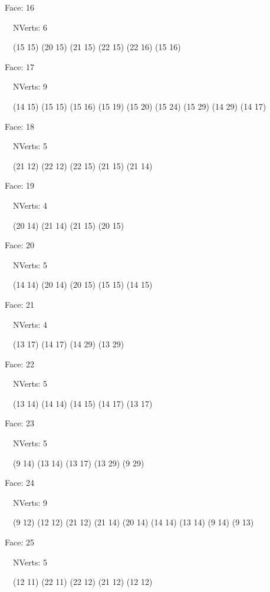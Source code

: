 \documentclass{article}
\begin{document}
{\footnotesize 

Face: 16

\   \    NVerts: 6

 \   \   (15 15) (20 15) (21 15) (22 15) (22 16) (15 16)}

{\footnotesize 

Face: 17

\   \    NVerts: 9

 \   \   (14 15) (15 15) (15 16) (15 19) (15 20) (15 24) (15 29) (14 29) (14 17)}

{\footnotesize 

Face: 18

\   \    NVerts: 5

 \   \   (21 12) (22 12) (22 15) (21 15) (21 14)}

{\footnotesize 

Face: 19

\   \    NVerts: 4

 \   \   (20 14) (21 14) (21 15) (20 15)}

{\footnotesize 

Face: 20

\   \    NVerts: 5

 \   \   (14 14) (20 14) (20 15) (15 15) (14 15)}

{\footnotesize 

Face: 21

\   \    NVerts: 4

 \   \   (13 17) (14 17) (14 29) (13 29)}

{\footnotesize 

Face: 22

\   \    NVerts: 5

 \   \   (13 14) (14 14) (14 15) (14 17) (13 17)}

{\footnotesize 

Face: 23

\   \    NVerts: 5

 \   \   (9 14) (13 14) (13 17) (13 29) (9 29)}

{\footnotesize 

Face: 24

\   \    NVerts: 9

 \   \   (9 12) (12 12) (21 12) (21 14) (20 14) (14 14) (13 14) (9 14) (9 13)}

{\footnotesize 

Face: 25

\   \    NVerts: 5

 \   \   (12 11) (22 11) (22 12) (21 12) (12 12)}
\end{document}
